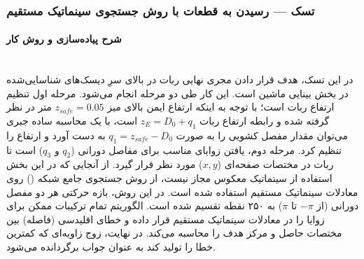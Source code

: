 \documentclass{article}
\begin{document}
\subsubsection{تسک  — رسیدن به قطعات با روش جستجوی سینماتیک مستقیم}
\paragraph{شرح پیاده‌سازی و روش کار}\mbox{}\\
در این تسک، هدف قرار دادن مجری نهایی ربات در بالای سرِ دیسک‌های شناسایی‌شده در بخش بینایی ماشین است. این کار طی دو مرحله انجام می‌شود. مرحله اول تنظیم ارتفاع ربات است؛ با توجه به اینکه ارتفاع ایمن بالای میز $z_{safe} = 0.05$ متر در نظر گرفته شده و رابطه ارتفاع ربات $z_E = D_0 + q_1$ است، با یک محاسبه ساده جبری می‌توان مقدار مفصل کشویی را به صورت $q_1 = z_{safe} - D_0$ به دست آورد و ارتفاع را تنظیم کرد.
مرحله دوم، یافتن زوایای مناسب برای مفاصل دورانی ($q_2$ و $q_3$) است تا ربات در مختصات صفحه‌ای ($x, y$) مورد نظر قرار گیرد. از آنجایی که در این بخش استفاده از سینماتیک معکوس مجاز نیست، از روش جستجوی جامع شبکه () روی معادلات سینماتیک مستقیم استفاده شده است. در این روش، بازه حرکتی هر دو مفصل دورانی (از $-\pi$ تا $\pi$) به ۲۵۰ نقطه تقسیم شده است. الگوریتم تمام ترکیبات ممکن برای زوایا را در معادلات سینماتیک مستقیم قرار داده و خطای اقلیدسی (فاصله) بین مختصات حاصل و مرکز هدف را محاسبه می‌کند. در نهایت، زوج زاویه‌ای که کمترین خطا را تولید کند به عنوان جواب برگردانده می‌شود.
\end{document}
